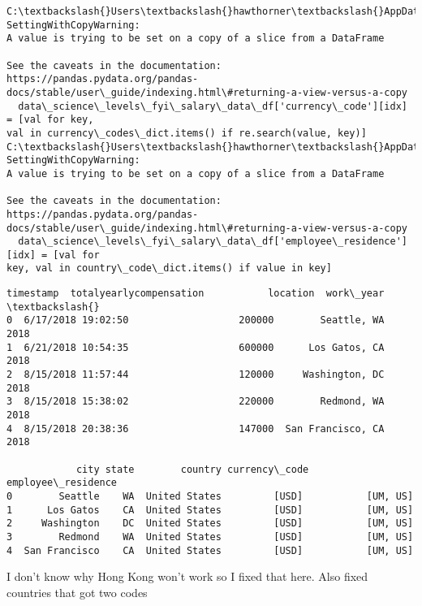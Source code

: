 \documentclass[11pt]{article}
\begin{document}
    \begin{Verbatim}[commandchars=\\\{\}]
C:\textbackslash{}Users\textbackslash{}hawthorner\textbackslash{}AppData\textbackslash{}Local\textbackslash{}Temp\textbackslash{}ipykernel\_22188\textbackslash{}3301572926.py:5:
SettingWithCopyWarning:
A value is trying to be set on a copy of a slice from a DataFrame

See the caveats in the documentation: https://pandas.pydata.org/pandas-
docs/stable/user\_guide/indexing.html\#returning-a-view-versus-a-copy
  data\_science\_levels\_fyi\_salary\_data\_df['currency\_code'][idx] = [val for key,
val in currency\_codes\_dict.items() if re.search(value, key)]
C:\textbackslash{}Users\textbackslash{}hawthorner\textbackslash{}AppData\textbackslash{}Local\textbackslash{}Temp\textbackslash{}ipykernel\_22188\textbackslash{}3301572926.py:6:
SettingWithCopyWarning:
A value is trying to be set on a copy of a slice from a DataFrame

See the caveats in the documentation: https://pandas.pydata.org/pandas-
docs/stable/user\_guide/indexing.html\#returning-a-view-versus-a-copy
  data\_science\_levels\_fyi\_salary\_data\_df['employee\_residence'][idx] = [val for
key, val in country\_code\_dict.items() if value in key]
    \end{Verbatim}

    \begin{Verbatim}[commandchars=\\\{\}]
            timestamp  totalyearlycompensation           location  work\_year  \textbackslash{}
0  6/17/2018 19:02:50                   200000        Seattle, WA       2018
1  6/21/2018 10:54:35                   600000      Los Gatos, CA       2018
2  8/15/2018 11:57:44                   120000     Washington, DC       2018
3  8/15/2018 15:38:02                   220000        Redmond, WA       2018
4  8/15/2018 20:38:36                   147000  San Francisco, CA       2018

            city state        country currency\_code employee\_residence
0        Seattle    WA  United States         [USD]           [UM, US]
1      Los Gatos    CA  United States         [USD]           [UM, US]
2     Washington    DC  United States         [USD]           [UM, US]
3        Redmond    WA  United States         [USD]           [UM, US]
4  San Francisco    CA  United States         [USD]           [UM, US]
    \end{Verbatim}

    I don't know why Hong Kong won't work so I fixed that here. Also fixed
countries that got two codes
\end{document}
